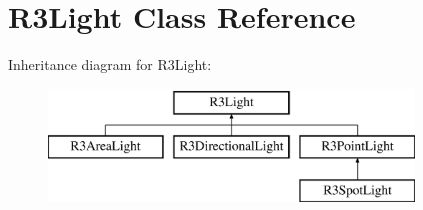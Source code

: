 \hypertarget{class_r3_light}{}\section{R3\+Light Class Reference}
\label{class_r3_light}
Inheritance diagram for R3\+Light\+:\begin{figure}[H]
\begin{center}
\leavevmode
\includegraphics[height=3.000000cm]{class_r3_light}
\end{center}
\end{figure}
